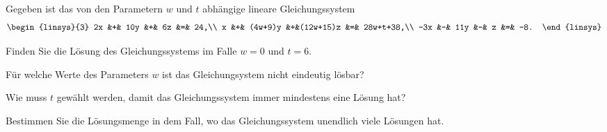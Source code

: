 Gegeben ist das von den Parametern $w$ und $t$ abhängige lineare
Gleichungssystem
\[
\begin{linsys}{3}
 2x &+&      10y &+&  6z      &=&       24,\\
  x &+&  (4w+9)y &+&(12w+15)z &=& 28w+t+38,\\
-3x &-&      11y &-&   z      &=&       -8.
\end{linsys}
\]
\begin{teilaufgaben}
\item
Finden Sie die Lösung des Gleichungssystems im Falle $w=0$ und $t=6$.
\item
Für welche Werte des Parameters $w$ ist das Gleichungsystem nicht eindeutig
lösbar?
\item
Wie muss $t$ gewählt werden, damit das Gleichungssystem immer mindestens
eine Lösung hat?
\item
Bestimmen Sie die Lösungsmenge in dem Fall, wo das Gleichungssystem unendlich
viele Lösungen hat.
\end{teilaufgaben}

